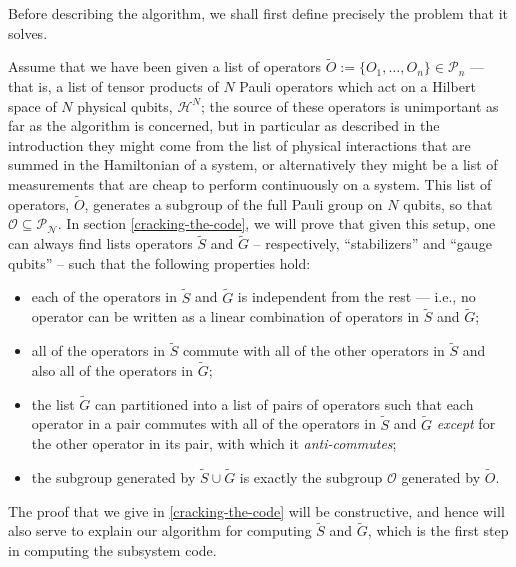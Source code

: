 \documentclass[twocolumn,showpacs,preprintnumbers,amsmath,amssymb,nofootinbib,pra,floatfix]{revtex4}
\begin{document}
Before describing the algorithm, we shall first define precisely the problem that it solves.

Assume that we have been given a list of operators $\tilde O :=\{O_1,\dots,O_n\}\in \mathcal{P}_n$ --- that is, a list of tensor products of $N$ Pauli operators which act on a Hilbert space of $N$ physical qubits, $\mathscr{H}^N$;  the source of these operators is unimportant as far as the algorithm is concerned, but in particular as described in the introduction they might come from the list of physical interactions that are summed in the Hamiltonian of a system, or alternatively they might be a list of measurements that are cheap to perform continuously on a system.  This list of operators, $\tilde O$, generates a subgroup of the full Pauli group on $N$ qubits, so that $\mathcal{O}\subseteq\mathcal{P_N}$.  In section \ref{cracking-the-code}, we will prove that given this setup, one can always find lists operators $\tilde S$ and $\tilde G$ -- respectively, ``stabilizers'' and ``gauge qubits'' -- such that the following properties hold:
\begin{itemize}
\item each of the operators in $\tilde S$ and $\tilde G$ is independent from the rest --- i.e., no operator can be written as a linear combination of operators in $\tilde S$ and $\tilde G$;
\item all of the operators in $\tilde S$ commute with all of the other operators in $\tilde S$ and also all of the operators in $\tilde G$;
\item the list $\tilde G$ can partitioned into a list of pairs of operators such that each operator in a pair commutes with all of the operators in $\tilde S$ and $\tilde G$ \emph{except} for the other operator in its pair, with which it \emph{anti-commutes};
\item the subgroup generated by $\tilde S \cup \tilde G$ is exactly the subgroup $\mathcal{O}$ generated by $\tilde O$.
\end{itemize}
The proof that we give in \ref{cracking-the-code} will be constructive, and hence will also serve to explain our algorithm for computing $\tilde S$ and $\tilde G$, which is the first step in computing the subsystem code.
\end{document}
